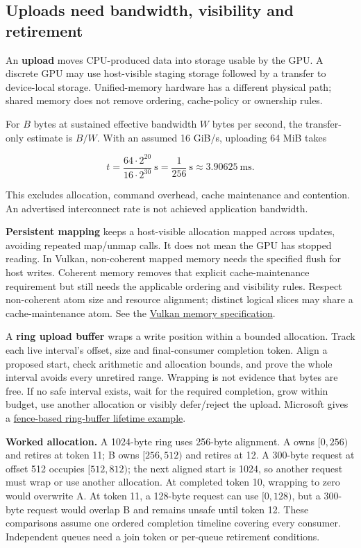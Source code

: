 \subsection{Uploads need bandwidth, visibility and retirement}\label{03-visual-computing-i-ch016-uploads-need-bandwidth-visibility-and-retirement}

An \textbf{upload} moves CPU-produced data into storage usable by the GPU. A discrete GPU may use host-visible staging storage followed by a transfer to device-local storage. Unified-memory hardware has a different physical path; shared memory does not remove ordering, cache-policy or ownership rules.

For \(B\) bytes at sustained effective bandwidth \(W\) bytes per second, the transfer-only estimate is \(B/W\). With an assumed 16 GiB/s, uploading 64 MiB takes

\[
t=\frac{64\cdot2^{20}}{16\cdot2^{30}}\ \mathrm{s}
 =\frac1{256}\ \mathrm{s}\approx3.90625\ \mathrm{ms}.
\]

This excludes allocation, command overhead, cache maintenance and contention. An advertised interconnect rate is not achieved application bandwidth.

\textbf{Persistent mapping} keeps a host-visible allocation mapped across updates, avoiding repeated map/unmap calls. It does not mean the GPU has stopped reading. In Vulkan, non-coherent mapped memory needs the specified flush for host writes. Coherent memory removes that explicit cache-maintenance requirement but still needs the applicable ordering and visibility rules. Respect non-coherent atom size and resource alignment; distinct logical slices may share a cache-maintenance atom. See the \href{https://docs.vulkan.org/spec/latest/chapters/memory.html}{Vulkan memory specification}.

A \textbf{ring upload buffer} wraps a write position within a bounded allocation. Track each live interval's offset, size and final-consumer completion token. Align a proposed start, check arithmetic and allocation bounds, and prove the whole interval avoids every unretired range. Wrapping is not evidence that bytes are free. If no safe interval exists, wait for the required completion, grow within budget, use another allocation or visibly defer/reject the upload. Microsoft gives a \href{https://learn.microsoft.com/en-us/windows/win32/direct3d12/fence-based-resource-management}{fence-based ring-buffer lifetime example}.

\textbf{Worked allocation.} A 1024-byte ring uses 256-byte alignment. A owns \([0,256)\) and retires at token 11; B owns \([256,512)\) and retires at 12. A 300-byte request at offset 512 occupies \([512,812)\); the next aligned start is 1024, so another request must wrap or use another allocation. At completed token 10, wrapping to zero would overwrite A. At token 11, a 128-byte request can use \([0,128)\), but a 300-byte request would overlap B and remains unsafe until token 12. These comparisons assume one ordered completion timeline covering every consumer. Independent queues need a join token or per-queue retirement conditions.

